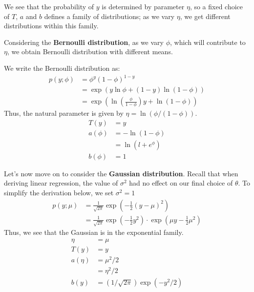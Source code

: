 \documentclass[fontset=windows,pass]{article}
\numberwithin{equation}{subsection} %
\begin{document}
We see that the probability of $y$ is determined by parameter $\eta$, so a fixed choice of $T$, $a$ and $b$ defines a family of distributions;
as we vary $\eta$, we get different distributions within this family.

Considering the \textbf{Bernoulli distribution}, as we vary $\phi$, which will contribute to $\eta$, we obtain Bernoulli distribution with different means.

We write the Bernoulli distribution as:
\begin{equation*}
	\begin{aligned}
		p(y; \phi) & = \phi^{y} \left(1-\phi\right)^{1-y}\\
		           & = \exp\left(y\ln\phi + (1-y)\ln(1-\phi)\right)\\
				   & = \exp\left(\ln\left(\frac{\phi}{1-\phi}\right)y + \ln(1-\phi)\right)
	\end{aligned}
\end{equation*}
Thus, the natural parameter is given by $\eta = \ln(\phi/(1-\phi))$.
\begin{equation*}
	\begin{aligned}
		T(y) & = y\\
		a(\phi) & = -\ln(1-\phi)\\
				& = \ln(l+e^{\phi})\\
		b(\phi) & = 1
	\end{aligned}
\end{equation*}

Let's now move on to consider the \textbf{Gaussian distribution}. Recall that when deriving linear regression, the value of $\sigma^2$
had no effect on our final choice of $\theta$. To simplify the derivation below, we set $\sigma^2 = 1$
\begin{equation*}
	\begin{aligned}
		p(y ; \mu) & =\frac{1}{\sqrt{2 \pi}} \exp \left(-\frac{1}{2}(y-\mu)^{2}\right) \\
		& =\frac{1}{\sqrt{2 \pi}} \exp \left(-\frac{1}{2} y^{2}\right) \cdot \exp \left(\mu y-\frac{1}{2} \mu^{2}\right)
		\end{aligned}
\end{equation*}
Thus, we see that the Gaussian is in the exponential family.
\begin{equation*}
	\begin{aligned}
		\eta & =\mu \\
		T(y) & =y \\
		a(\eta) & =\mu^{2} / 2 \\
		& =\eta^{2} / 2 \\
		b(y) & =(1 / \sqrt{2 \pi}) \exp \left(-y^{2} / 2\right)
		\end{aligned}
\end{equation*}
\end{document}
